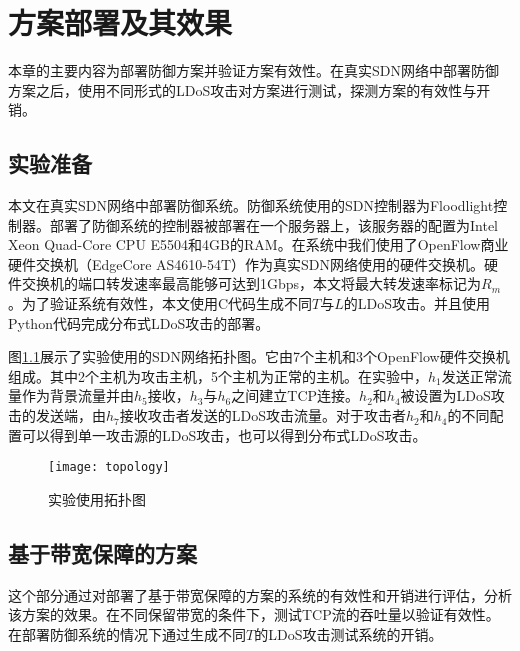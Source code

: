 \chapter{方案部署及其效果}
\label{cha:experiment}
本章的主要内容为部署防御方案并验证方案有效性。在真实SDN网络中部署防御方案之后，使用不同形式的LDoS攻击对方案进行测试，探测方案的有效性与开销。

\section{实验准备}
\label{chap5:setup}
本文在真实SDN网络中部署防御系统。防御系统使用的SDN控制器为Floodlight控制器。部署了防御系统的控制器被部署在一个服务器上，该服务器的配置为Intel Xeon Quad-Core CPU E5504和4GB的RAM。在系统中我们使用了OpenFlow商业硬件交换机（EdgeCore AS4610-54T）作为真实SDN网络使用的硬件交换机。硬件交换机的端口转发速率最高能够可达到1Gbps，本文将最大转发速率标记为$R_m$。为了验证系统有效性，本文使用C代码生成不同$T$与$L$的LDoS攻击。并且使用Python代码完成分布式LDoS攻击的部署。

图\ref{fig:topology}展示了实验使用的SDN网络拓扑图。它由7个主机和3个OpenFlow硬件交换机组成。其中2个主机为攻击主机，5个主机为正常的主机。在实验中，$h_1$发送正常流量作为背景流量并由$h_5$接收，$h_3$与$h_6$之间建立TCP连接。$h_2$和$h_4$被设置为LDoS攻击的发送端，由$h_7$接收攻击者发送的LDoS攻击流量。对于攻击者$h_2$和$h_4$的不同配置可以得到单一攻击源的LDoS攻击，也可以得到分布式LDoS攻击。


\begin{figure}
    \centering
    \texttt{[image: topology]}
    \caption{实验使用拓扑图}
    \label{fig:topology}
\end{figure}


\section{基于带宽保障的方案}
\label{chap5:bandwidth-reserve-solution}

这个部分通过对部署了基于带宽保障的方案的系统的有效性和开销进行评估，分析该方案的效果。在不同保留带宽的条件下，测试TCP流的吞吐量以验证有效性。在部署防御系统的情况下通过生成不同$T$的LDoS攻击测试系统的开销。

